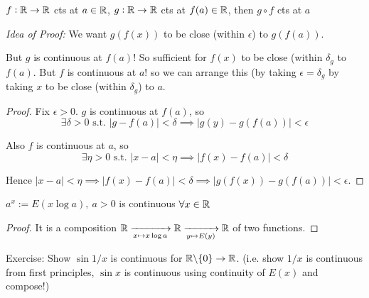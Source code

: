 \documentclass[10pt,twoside]{scrartcl}
\begin{document}
\begin{theorem}
	$f:\mathbb{R} \to \mathbb{R}$ cts at $a \in \mathbb{R}$, $g:\mathbb{R} \to \mathbb{R}$ cts at $f(a) \in \mathbb{R}$, then $g \circ f$ cts at $a$
\end{theorem}

\emph{Idea of Proof:} We want $g(f(x))$ to be close (within $\epsilon$) to $g(f(a))$. 

But $g$ is continuous at $f(a)$! So sufficient for $f(x)$ to be close (within $\delta_g$ to $f(a)$. But $f$ is continuous at $a$! so we can arrange this (by taking $\epsilon = \delta_g$ by taking $x$ to be close (within $\delta_g$) to $a$. 

\begin{proof}
Fix $\epsilon >0.$ $g$ is continuous at $f(a)$, so \[\exists \delta > 0\text{ s.t. }|g - f(a)| < \delta \implies |g(y) - g(f(a))| < \epsilon\]

Also $f$ is continuous at $a$, so 
\[\exists \eta > 0\text{ s.t. }|x-a| < \eta \implies |f(x) - f(a)| < \delta\]

\noindent Hence $|x-a| < \eta \implies |f(x) - f(a)| < \delta \implies |g(f(x)) - g(f(a))| < \epsilon.$
\end{proof}

\begin{corollary}
$a^x:= E(x\log a), ~a>0$ is continuous $\forall x \in\mathbb{R}$	
\end{corollary}
\begin{proof}
It is a composition $\displaystyle{\mathbb{R}\xrightarrow[x \mapsto x\log a]{} \mathbb{R}\xrightarrow[y \mapsto E(y)]{} \mathbb{R}}$ of two functions.	
\end{proof}

Exercise: Show $\sin 1/x$ is continuous for $\mathbb{R}\backslash\{0\} \to \mathbb{R}$. (i.e. show $1/x$ is continuous from first principles, $\sin x$ is continuous using continuity of $E(x)$ and compose!)\vspace*{15pt}
\end{document}
